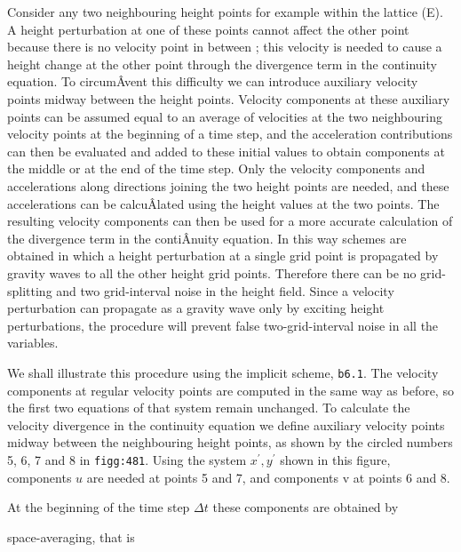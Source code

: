 Consider any two neighbouring height points for example within the
lattice (E). A height perturbation at one of these points cannot affect
the other point because there is no velocity point in between ; this
velocity is needed to cause a height change at the other point through
the divergence term in the continuity equation. To circumÂ­vent this
difficulty we can introduce auxiliary velocity points midway between the
height points. Velocity components at these auxiliary points can be
assumed equal to an average of velocities at the two neighbouring
velocity points at the beginning of a time step, and the acceleration
contributions can then be evaluated and added to these initial values to
obtain components at the middle or at the end of the time step. Only the
velocity components and accelerations along directions joining the two
height points are needed, and these accelerations can be calcuÂ­lated
using the height values at the two points. The resulting velocity
components can then be used for a more accurate calculation of the
divergence term in the contiÂ­nuity equation. In this way schemes are
obtained in which a height perturbation at a single grid point is
propagated by gravity waves to all the other height grid points.
Therefore there can be no grid-splitting and two grid-interval noise in
the height field. Since a velocity perturbation can propagate as a
gravity wave only by exciting height perturbations, the procedure will
prevent false two-grid-interval noise in all the variables.

We shall illustrate this procedure using the implicit scheme,
\texttt{b6.1}. The velocity components at regular velocity points are
computed in the same way as before, so the first two equations of that
system remain unchanged. To calculate the velocity divergence in the
continuity equation we define auxiliary velocity points midway between
the neighbouring height points, as shown by the circled numbers 5, 6, 7
and 8 in \texttt{figg:481}. Using the system \(x^{'},y^{'}\) shown in
this figure, components \(u\) are needed at points 5 and 7, and
components v\textquotesingle{} at points 6 and 8.

At the beginning of the time step \(\Delta t\) these components are
obtained by

\begin{figure}
\centering
{}
\caption{}
\end{figure}

space-averaging, that is

